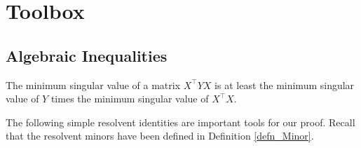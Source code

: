 \section{Toolbox}\label{app_tool}

\subsection{Algebraic Inequalities}

\begin{fact}\label{fact_proof_gA}
	The minimum singular value of a matrix $X^{\top}YX$ is at least the minimum singular value of $Y$ times the minimum singular value of $X^{\top}X$.
\end{fact}

The following simple resolvent identities are important tools for our proof. Recall that the resolvent minors have been defined in Definition \ref{defn_Minor}.
